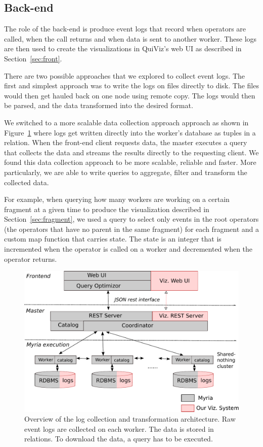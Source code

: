 \documentclass{chi2009}
\newcommand*{\system}{QuiViz\xspace}
\begin{document}
\subsection{Back-end}
\label{sec:back}

The role of the back-end is produce event logs that record when operators are called, when the call returns and when data is sent to another worker. These logs are then used to create the visualizations in \system's web UI as described in Section~\ref{sec:front}.

There are two possible approaches that we explored to collect event logs. The first and simplest approach was to write the logs on files directly to disk. The files would then get hauled back on one node using remote copy. The logs would then be parsed, and the data transformed into the desired format.

We switched to a more scalable data collection approach approach as shown in Figure~\ref{fig:arch} where logs get written directly into the worker's database as tuples in a relation. When the front-end client requests data, the master executes a query that collects the data and streams the results directly to the requesting client. We found this data collection approach to be more scalable, reliable and faster. More particularly, we are able to write queries to aggregate, filter and transform the collected data.

For example, when querying how many workers are working on a certain fragment at a given time to produce the visualization described in Section~\ref{sec:fragment}, we used a query to select only events in the root operators (the operators that have no parent in the same fragment) for each fragment and a custom map function that carries state. The state is an integer that is incremented when the operator is called on a worker and decremented when the operator returns.

\begin{figure}[ht]
  \includegraphics[width=\columnwidth]{images/viz_arch}
  \caption{Overview of the log collection and transformation architecture. Raw event logs are collected on each worker. The data is stored in relations. To download the data, a query has to be executed.}
  \label{fig:arch}
\end{figure}
\end{document}
